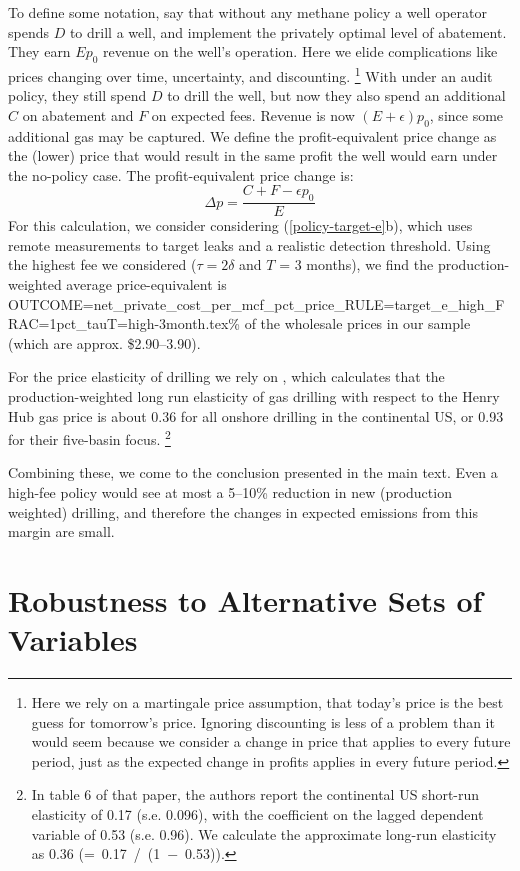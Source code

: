 \documentclass[12pt,oneside,letterpaper]{article}
\theoremstyle{definition}
\begin{document}
\begin{refsection}
To define some notation, say that without any methane policy a well operator spends \(D\) to drill a well, and implement the privately optimal level of abatement.
They earn \(E p_0\) revenue on the well's operation.
Here we elide complications like prices changing over time, uncertainty, and discounting.%
\footnote{%
Here we rely on a martingale price assumption, that today's price is the best guess for tomorrow's price.
Ignoring discounting is less of a problem than it would seem because we consider a change in price that applies to every future period, just as the expected change in profits applies in every future period.
}
With under an audit policy, they still spend \(D\) to drill the well, but now they also spend an additional \(C\) on abatement and \(F\) on expected fees.
Revenue is now \((E + \epsilon) p_0\), since some additional gas may be captured.
We define the profit-equivalent price change as the (lower) price that would result in the same profit the well would earn under the no-policy case.
The profit-equivalent price change is:
\[
\Delta p = \frac{C + F - \epsilon p_0}{E}
\]
For this calculation, we consider considering (\ref{policy-target-e}b), which uses remote measurements to target leaks and a realistic detection threshold.
Using the highest fee we considered (\(\tau = 2\delta\) and \(T\) = 3 months),
we find the production-weighted average price-equivalent is
{OUTCOME=net_private_cost_per_mcf_pct_price_RULE=target_e_high_FRAC=1pct_tauT=high-3month.tex}\%
of the wholesale prices in our sample (which are approx. \$2.90--3.90).

For the price elasticity of drilling we rely on \textcite{Gilbert/Roberts:2020}, which calculates that the production-weighted long run elasticity of gas drilling with respect to the Henry Hub gas price is about 0.36 for all onshore drilling in the continental US, or 0.93 for their five-basin focus.
\footnote{%
In table 6 of that paper, the authors report the continental US short-run elasticity of 0.17 (s.e. 0.096), with the coefficient on the lagged dependent variable of 0.53 (s.e. 0.96).
We calculate the approximate long-run elasticity as 0.36 (\hbox{= 0.17 / (1 \(-\) 0.53)}).
}

Combining these, we come to the conclusion presented in the main text.
Even a high-fee policy would see at most a 5--10\% reduction in new (production weighted) drilling, and therefore the changes in expected emissions from this margin are small.

\section{Robustness to Alternative Sets of Variables}
\label{app:robustness-to-alternative-sets-of-variables}


\end{refsection}
\end{document}
